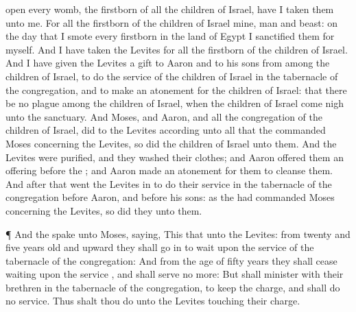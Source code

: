 {open every
womb,
{} the
firstborn of all the
children of
Israel, have I
taken them unto me.
For all the
firstborn of the
children of
Israel
{} mine,
{}
man and
beast: on the
day that I
smote every
firstborn in the
land of
Egypt I
sanctified them for myself.
And I have
taken the
Levites for all the
firstborn of the
children of
Israel.
And I have
given the
Levites
{} a
gift to
Aaron and to his
sons from
among the
children of
Israel, to
do the
service of the
children of
Israel in the
tabernacle of the
congregation, and to make an
atonement for the
children of
Israel: that there be no
plague among the
children of
Israel, when the
children of
Israel come
nigh unto the
sanctuary.
And
Moses, and
Aaron, and all the
congregation of the
children of
Israel,
did to the
Levites according unto all that the
{}
commanded
Moses concerning the
Levites, so
did the
children of
Israel unto them.
And the
Levites were
purified, and they
washed their
clothes; and
Aaron
offered them
{} an
offering
before the
{}; and
Aaron made an
atonement for them to
cleanse them.
And
after that
went the
Levites in to
do their
service in the
tabernacle of the
congregation
before
Aaron, and
before his
sons: as the
{} had
commanded
Moses concerning the
Levites, so
did they unto them.
\par }{\PP {}¶ And the
{}
spake unto
Moses,
saying,
This
{} that
{} unto the
Levites: from
twenty and
five
years
old and
upward they shall go
in to
wait upon the
service of the
tabernacle of the
congregation:
And from the
age of
fifty
years they shall
cease
waiting upon the
service
{}, and shall
serve no more:
But shall
minister with their
brethren in the
tabernacle of the
congregation, to
keep the
charge, and shall
do no
service. Thus shalt thou
do unto the
Levites touching their
charge.

}

